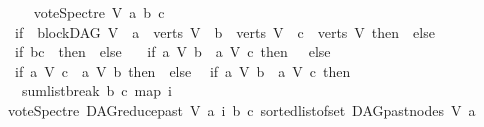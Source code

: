 \begin{isabellebody}
\ \ \isanewline
\ \ {\isachardoublequoteopen}vote{\isacharunderscore}{\kern0pt}Spectre\ V\ a\ b\ c\ {\isacharequal}{\kern0pt}\ {\isacharparenleft}{\kern0pt}\isanewline
\ \ if\ {\isacharparenleft}{\kern0pt}{\isasymnot}\ blockDAG\ V\ {\isasymor}\ a\ {\isasymnotin}\ verts\ V\ {\isasymor}\ b\ {\isasymnotin}\ verts\ V\ {\isasymor}\ c\ {\isasymnotin}\ verts\ V{\isacharparenright}{\kern0pt}\ then\ {}\ else\ \isanewline
\ \ if\ {\isacharparenleft}{\kern0pt}b{\isacharequal}{\kern0pt}c{\isacharparenright}{\kern0pt}\ \ then\ {}\ else\ \isanewline
\ \ if\ {\isacharparenleft}{\kern0pt}{\isacharparenleft}{\kern0pt}a\ {\isasymrightarrow}\isactrlsup {\isacharasterisk}{\kern0pt}\isactrlbsub V\isactrlesub \ b{\isacharparenright}{\kern0pt}\ {\isasymand}\ {\isasymnot}{\isacharparenleft}{\kern0pt}a\ {\isasymrightarrow}\isactrlsup {\isacharplus}{\kern0pt}\isactrlbsub V\isactrlesub \ c{\isacharparenright}{\kern0pt}{\isacharparenright}{\kern0pt}\ then\ {}\ \ else\isanewline
\ \ if\ {\isacharparenleft}{\kern0pt}{\isacharparenleft}{\kern0pt}a\ {\isasymrightarrow}\isactrlsup {\isacharasterisk}{\kern0pt}\isactrlbsub V\isactrlesub \ c{\isacharparenright}{\kern0pt}\ {\isasymand}\ {\isasymnot}{\isacharparenleft}{\kern0pt}a\ {\isasymrightarrow}\isactrlsup {\isacharplus}{\kern0pt}\isactrlbsub V\isactrlesub \ b{\isacharparenright}{\kern0pt}{\isacharparenright}{\kern0pt}\ then\ {\isacharminus}{\kern0pt}{}\ else\isanewline
\ \ if\ {\isacharparenleft}{\kern0pt}{\isacharparenleft}{\kern0pt}a\ {\isasymrightarrow}\isactrlsup {\isacharplus}{\kern0pt}\isactrlbsub V\isactrlesub \ b{\isacharparenright}{\kern0pt}\ {\isasymand}\ {\isacharparenleft}{\kern0pt}a\ {\isasymrightarrow}\isactrlsup {\isacharplus}{\kern0pt}\isactrlbsub V\isactrlesub \ c{\isacharparenright}{\kern0pt}{\isacharparenright}{\kern0pt}\ then\ \isanewline
\ \ \ {\isacharparenleft}{\kern0pt}sumlist{\isacharunderscore}{\kern0pt}break\ b\ c\ {\isacharparenleft}{\kern0pt}map\ {\isacharparenleft}{\kern0pt}{\isasymlambda}i{\isachardot}{\kern0pt}\isanewline
\ {\isacharparenleft}{\kern0pt}vote{\isacharunderscore}{\kern0pt}Spectre\ {\isacharparenleft}{\kern0pt}DAG{\isachardot}{\kern0pt}reduce{\isacharunderscore}{\kern0pt}past\ V\ a{\isacharparenright}{\kern0pt}\ i\ b\ c{\isacharparenright}{\kern0pt}{\isacharparenright}{\kern0pt}\ {\isacharparenleft}{\kern0pt}sorted{\isacharunderscore}{\kern0pt}list{\isacharunderscore}{\kern0pt}of{\isacharunderscore}{\kern0pt}set\ {\isacharparenleft}{\kern0pt}{\isacharparenleft}{\kern0pt}DAG{\isachardot}{\kern0pt}past{\isacharunderscore}{\kern0pt}nodes\ V\ a{\isacharparenright}{\kern0pt}{\isacharparenright}{\kern0pt}{\isacharparenright}{\kern0pt}{\isacharparenright}{\kern0pt}{\isacharparenright}{\kern0pt}\isanewline

\end{isabellebody}

